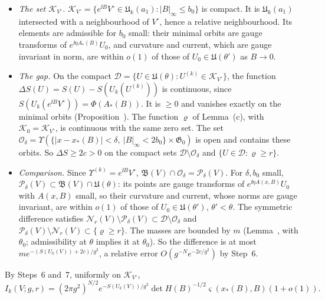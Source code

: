 \begin{detail}
\begin{step}
\begin{itemize}
\item \emph{The set $\mathcal K_{V^\circ}$.} $\mathcal K_{V^\circ}=\{e^{\ii B}V^\circ\in\mathfrak U_k(a_1):|B|_\infty\le b_0\}$ is compact. It is $\mathfrak U_k(a_1)$ intersected with a neighbourhood of $V^\circ$, hence a relative neighbourhood. Its elements are admissible for $b_0$ small: their minimal orbits are gauge transforms of $e^{\ii\eta A_*(B)}U_0$, and curvature and current, which are gauge invariant in norm, are within $o(1)$ of those of $U_0\in\mathfrak U(\theta')$ as $B\to0$.
\item \emph{The gap.} On the compact $\mathcal D=\{U\in\mathfrak U(\theta):U^{(k)}\in\mathcal K_{V^\circ}\}$, the function $\Delta S(U)=S(U)-S(U_k(U^{(k)}))$ is continuous, since $S(U_k(e^{\ii B}V^\circ))=\Phi(A_*(B))$. It is $\ge0$ and vanishes exactly on the minimal orbits (Proposition~). The function $\varrho$ of Lemma~(c), with $\mathcal K_0=\mathcal K_{V^\circ}$, is continuous with the same zero set. The set $\mathcal O_\delta=\Upsilon(\{|x-x_*(B)|<\delta,\ |B|_\infty<2b_0\}\times\mathfrak G_0)$ is open and contains these orbits. So $\Delta S\ge2c>0$ on the compact sets $\mathcal D\setminus\mathcal O_\delta$ and $\{U\in\mathcal D:\varrho\ge r\}$.
\item \emph{Comparison.} Since $\Upsilon^{(k)}=e^{\ii B}V^\circ$, $\mathfrak B(V)\cap\mathcal O_\delta=\mathcal P_\delta(V)$. For $\delta,b_0$ small, $\mathcal P_\delta(V)\subset\mathfrak B(V)\cap\mathfrak U(\theta)$: its points are gauge transforms of $e^{\ii\eta A(x,B)}U_0$ with $A(x,B)$ small, so their curvature and current, whose norms are gauge invariant, are within $o(1)$ of those of $U_0\in\mathfrak U(\theta')$, $\theta'<\theta$. The symmetric difference satisfies $\mathscr N_r(V)\setminus\mathcal P_\delta(V)\subset\mathcal D\setminus\mathcal O_\delta$ and $\mathcal P_\delta(V)\setminus\mathscr N_r(V)\subset\{\varrho\ge r\}$. The masses are bounded by $m$ (Lemma~, with $\theta_0$; admissibility at $\theta$ implies it at $\theta_0$). So the difference is at most $me^{-(S(U_k(V))+2c)/g^2}$, a relative error $O(g^{-N}e^{-2c/g^2})$ by Step~6.
\end{itemize}
\end{step}
\begin{step}[(vi) Conclusion]
By Steps~6 and~7, uniformly on $\mathcal K_{V^\circ}$,
\[
I_k(V;g,r)=(2\pi g^2)^{N/2}e^{-S(U_k(V))/g^2}\det H(B)^{-1/2}\varsigma(x_*(B),B)(1+o(1)).
\]

\end{step}
\end{detail}
